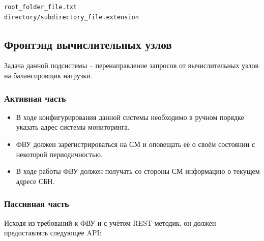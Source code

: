 \documentclass[a4paper,12pt]{report}
\numberwithin{equation}{section}
\begin{document}
\begin{lstlisting}[float={},language={},caption={Пример корректного файла со списком выходных файлов},label=lst:task-output]
root_folder_file.txt
directory/subdirectory_file.extension

\end{lstlisting}

\subsection{Фронтэнд вычислительных узлов}
Задача данной подсистемы -- перенаправление запросов от вычислительных узлов на балансировщик нагрузки.

\subsubsection{Активная часть}
\begin{itemize}
  \item В ходе конфигурирования данной системы необходимо в ручном порядке указать адрес системы мониторинга.
  \item ФВУ должен зарегистрироваться на СМ и оповещать её о своём состоянии с некоторой периодичностью.
  \item В ходе работы ФВУ должен получать со стороны СМ информацию о текущем адресе СБН.
\end{itemize}

\subsubsection{Пассивная часть}
Исходя из требований к ФВУ и с учётом REST-методик, он должен предоставлять следующее API:
\end{document}
